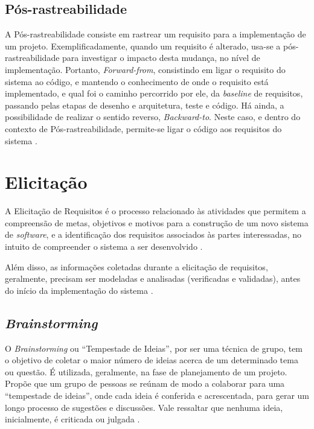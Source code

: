 \subsection{Pós-rastreabilidade}

\label{sec:pos-rastreabilidade}

A Pós-rastreabilidade consiste em rastrear um requisito para a implementação de um projeto. Exemplificadamente, quando um requisito é alterado, usa-se a pós-rastreabilidade para investigar o impacto desta mudança, no nível de implementação. Portanto, \textit{Forward-from}, consistindo em ligar o requisito do sistema ao código, e mantendo o conhecimento de onde o requisito está implementado, e qual foi o caminho percorrido por ele, da \textit{baseline} de requisitos, passando pelas etapas de desenho e arquitetura, teste e código. Há ainda, a possibilidade de realizar o sentido reverso, \textit{Backward-to}. Neste caso, e dentro do contexto de Pós-rastreabilidade, permite-se ligar o código aos requisitos do sistema \cite{pinheiro2004requirements}.

\section {Elicitação}

\label{sec:elicitacao}

A Elicitação de Requisitos é o processo relacionado às atividades que permitem a compreensão de metas, objetivos e motivos para a construção de um novo sistema de \textit{software}, e a identificação dos requisitos associados às partes interessadas, no intuito de compreender o sistema a ser desenvolvido \cite{elliott2012software}.

Além disso, as informações coletadas durante a elicitação de requisitos, geralmente, precisam ser modeladas e analisadas (verificadas e validadas), antes do início da implementação do sistema \cite{nuseibeh2000requirements}.

\subsection{\textit{Brainstorming}}

\label{sec:brainstorming}

O \textit{Brainstorming} ou “Tempestade de Ideias”, por ser uma técnica de grupo, tem o objetivo de coletar o maior número de ideias acerca de um determinado tema ou questão. É utilizada, geralmente, na fase de planejamento de um projeto. Propõe que um grupo de pessoas se reúnam de modo a colaborar para uma “tempestade de ideias”, onde cada ideia é conferida e acrescentada, para gerar um longo processo de sugestões e discussões. Vale ressaltar que nenhuma ideia, inicialmente, é criticada ou julgada \cite{mazzotti2012exploraccao}.

